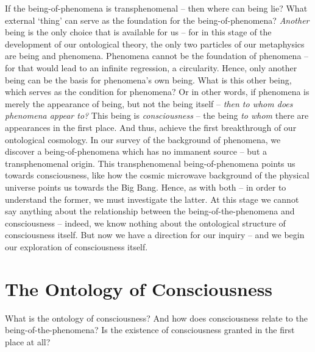 If the being-of-phenomena is transphenomenal -- then where can being lie? What external \enquote*{thing} can serve as the foundation for the being-of-phenomena? \emph{Another} being is the only choice that is available for us -- for in this stage of the development of our ontological theory, the only two particles of our metaphysics are being and phenomena. Phenomena cannot be the foundation of phenomena -- for that would lead to an infinite regression, a circularity. Hence, only another being can be the basis for phenomena's own being. What is this other being, which serves as the condition for phenomena? Or in other words, if phenomena is merely the appearance of being, but not the being itself -- \emph{then to whom does phenomena appear to?} This being is \emph{consciousness} -- the being \emph{to whom} there are appearances in the first place. And thus, achieve the first breakthrough of our ontological cosmology. In our survey of the background of phenomena, we discover a being-of-phenomena which has no immanent source -- but a transphenomenal origin. This transphenomenal being-of-phenomena points us towards consciousness, like how the cosmic microwave background of the physical universe points us towards the Big Bang. Hence, as with both -- in order to understand the former, we must investigate the latter. At this stage we cannot say anything about the relationship between the being-of-the-phenomena and consciousness -- indeed, we know nothing about the ontological structure of consciousness itself. But now we have a direction for our inquiry -- and we begin our exploration of consciousness itself.

\section{The Ontology of Consciousness}

What is the ontology of consciousness? And how does consciousness relate to the being-of-the-phenomena? Is the existence of consciousness granted in the first place at all? 





